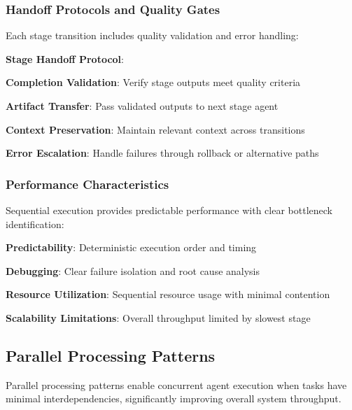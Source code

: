 \subsubsection*{Handoff Protocols and Quality Gates}

Each stage transition includes quality validation and error handling:

\begin{alertbox}
\textbf{Stage Handoff Protocol}:
\begin{compactlist}
    \item \textbf{Completion Validation}: Verify stage outputs meet quality criteria
    \item \textbf{Artifact Transfer}: Pass validated outputs to next stage agent
    \item \textbf{Context Preservation}: Maintain relevant context across transitions
    \item \textbf{Error Escalation}: Handle failures through rollback or alternative paths
\end{compactlist}
\end{alertbox}

\subsubsection*{Performance Characteristics}

Sequential execution provides predictable performance with clear bottleneck identification:

\begin{compactlist}
    \item \textbf{Predictability}: Deterministic execution order and timing
    \item \textbf{Debugging}: Clear failure isolation and root cause analysis
    \item \textbf{Resource Utilization}: Sequential resource usage with minimal contention
    \item \textbf{Scalability Limitations}: Overall throughput limited by slowest stage
\end{compactlist}

\subsection*{Parallel Processing Patterns}

Parallel processing patterns enable concurrent agent execution when tasks have minimal interdependencies, significantly improving overall system throughput.

